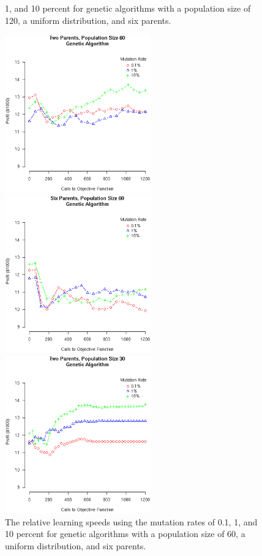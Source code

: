 \documentclass[12pt]{article}
\begin{document}
\begin{figure}[!ht]
\begin{minipage}[b]{0.5\linewidth}
{      1, and 10 percent for genetic algorithms with a population size of 120, a
      uniform distribution, and six parents.}
  \end{minipage}
  \begin{minipage}[b]{0.5\linewidth}
    \center
    \includegraphics[width=6.3cm]{Gen2ParentsPop60.eps}
    \caption{The relative learning speeds using the mutation rates of 0.1,
      1, and 10 percent for genetic algorithms with a population size of 60, a
      uniform distribution, and two parents.}
  \end{minipage}
\hspace{0.5cm} %
  \begin{minipage}[b]{0.5\linewidth}
    \center
    \includegraphics[width=6.3cm]{Gen6ParentsPop60.eps}
    \caption{The relative learning speeds using the mutation rates of 0.1,
      1, and 10 percent for genetic algorithms with a population size of 60, a
      uniform distribution, and six parents.}
  \end{minipage}
  \begin{minipage}[b]{0.5\linewidth}
    \center
    \includegraphics[width=6.3cm]{Gen2ParentsPop30.eps}

\end{minipage}
\end{figure}
\end{document}
